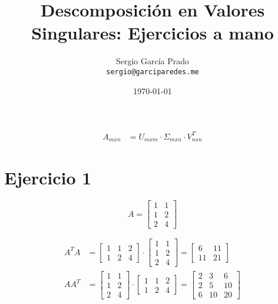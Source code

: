 \documentclass[a4paper, spanish]{article}
\title{Descomposición en Valores Singulares: Ejercicios a mano}
\author{Sergio García Prado \\ \texttt{sergio@garciparedes.me}}
\date{\today}
\begin{document}
  \maketitle

  \begin{align}
    A_{mxn} &= U_{mxm} \cdot \Sigma_{mxn} \cdot V_{nxn}^T
  \end{align}

  \section{Ejercicio 1}

  \begin{equation}
    A =
    \begin{bmatrix}
      1 & 1\\
      1 & 2\\
      2 & 4
    \end{bmatrix}
  \end{equation}

  \begin{align}
    A^T A &=
    \begin{bmatrix}
      1 & 1 & 2\\
      1 & 2 & 4
    \end{bmatrix}
    \cdot
    \begin{bmatrix}
      1 & 1\\
      1 & 2\\
      2 & 4
    \end{bmatrix}
    =
    \begin{bmatrix}
      6 & 11\\
      11 & 21
    \end{bmatrix} \\
    A A^T &=
    \begin{bmatrix}
      1 & 1\\
      1 & 2\\
      2 & 4
    \end{bmatrix}
    \cdot
    \begin{bmatrix}
      1 & 1 & 2\\
      1 & 2 & 4
    \end{bmatrix}
    =
    \begin{bmatrix}
      2 & 3 & 6 \\
      2 & 5 & 10 \\
      6 & 10 & 20
    \end{bmatrix} \\
  \end{align}
\end{document}
